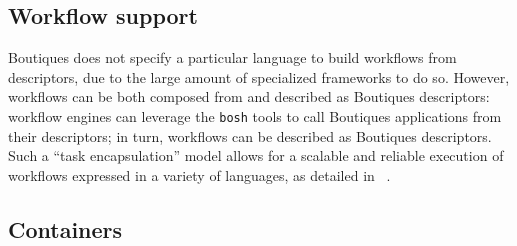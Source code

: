 \documentclass[a4paper,num-refs]{oup-contemporary}
\newcommand{\boutiques}{Boutiques\xspace}
\begin{document}


\subsection{Workflow support}

\boutiques does not specify a particular language to build workflows
from descriptors, due to the large amount of specialized frameworks to
do so. However, workflows can be both composed from and described as
\boutiques descriptors: workflow engines can leverage the
\texttt{bosh} tools to call \boutiques applications from their
descriptors; in turn, workflows can be described as \boutiques
descriptors. Such a ``task encapsulation'' model allows for a scalable
and reliable execution of workflows expressed in a variety of
languages, as detailed in ~\cite{GLATARD2017239}.

\subsection{Containers}
\end{document}
